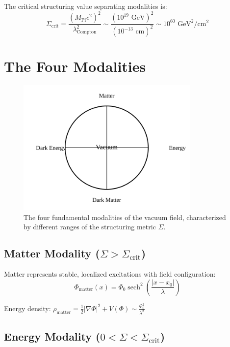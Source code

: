 \documentclass[12pt,a4paper]{article}
\newcommand{\structuring}{\Sigma}
\newcommand{\planck}{M_{\text{Pl}}}
\begin{document}
The critical structuring value separating modalities is:
\begin{equation}
\structuring_{\text{crit}} = \frac{(\planck c^2)^2}{\lambda_{\text{Compton}}^2} \sim \frac{(10^{19} \text{ GeV})^2}{(10^{-13} \text{ cm})^2} \sim 10^{60} \text{ GeV}^2/\text{cm}^2
\label{eq:sigma_crit}
\end{equation}

\section{The Four Modalities}

\begin{figure}[h]
\centering
\includegraphics[width=0.8\textwidth]{../figures/fig3_modalities.svg}
\caption{The four fundamental modalities of the vacuum field, characterized by different ranges of the structuring metric $\structuring$.}
\label{fig:modalities}
\end{figure}

\subsection{Matter Modality ($\structuring > \structuring_{\text{crit}}$)}

Matter represents stable, localized excitations with field configuration:
\begin{equation}
\Phi_{\text{matter}}(x) = \Phi_0 \operatorname{sech}^2\left(\frac{|x-x_0|}{\lambda}\right)
\end{equation}

Energy density: $\rho_{\text{matter}} = \frac{1}{2}|\nabla\Phi|^2 + V(\Phi) \sim \frac{\Phi_0^2}{\lambda^2}$

\subsection{Energy Modality ($0 < \structuring < \structuring_{\text{crit}}$)}
\end{document}
